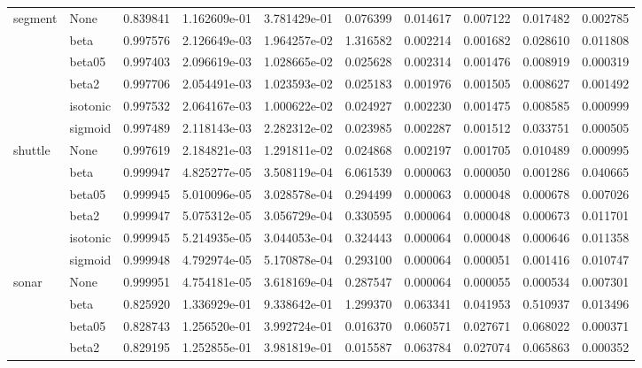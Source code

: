 \begin{tabular}{llrrrrrrrr}
segment & None &  0.839841 &  1.162609e-01 &  3.781429e-01 &   0.076399 &  0.014617 &  0.007122 &  0.017482 &  0.002785 \\
        & beta &  0.997576 &  2.126649e-03 &  1.964257e-02 &   1.316582 &  0.002214 &  0.001682 &  0.028610 &  0.011808 \\
        & beta05 &  0.997403 &  2.096619e-03 &  1.028665e-02 &   0.025628 &  0.002314 &  0.001476 &  0.008919 &  0.000319 \\
        & beta2 &  0.997706 &  2.054491e-03 &  1.023593e-02 &   0.025183 &  0.001976 &  0.001505 &  0.008627 &  0.001492 \\
        & isotonic &  0.997532 &  2.064167e-03 &  1.000622e-02 &   0.024927 &  0.002230 &  0.001475 &  0.008585 &  0.000999 \\
        & sigmoid &  0.997489 &  2.118143e-03 &  2.282312e-02 &   0.023985 &  0.002287 &  0.001512 &  0.033751 &  0.000505 \\
shuttle & None &  0.997619 &  2.184821e-03 &  1.291811e-02 &   0.024868 &  0.002197 &  0.001705 &  0.010489 &  0.000995 \\
        & beta &  0.999947 &  4.825277e-05 &  3.508119e-04 &   6.061539 &  0.000063 &  0.000050 &  0.001286 &  0.040665 \\
        & beta05 &  0.999945 &  5.010096e-05 &  3.028578e-04 &   0.294499 &  0.000063 &  0.000048 &  0.000678 &  0.007026 \\
        & beta2 &  0.999947 &  5.075312e-05 &  3.056729e-04 &   0.330595 &  0.000064 &  0.000048 &  0.000673 &  0.011701 \\
        & isotonic &  0.999945 &  5.214935e-05 &  3.044053e-04 &   0.324443 &  0.000064 &  0.000048 &  0.000646 &  0.011358 \\
        & sigmoid &  0.999948 &  4.792974e-05 &  5.170878e-04 &   0.293100 &  0.000064 &  0.000051 &  0.001416 &  0.010747 \\
sonar & None &  0.999951 &  4.754181e-05 &  3.618169e-04 &   0.287547 &  0.000064 &  0.000055 &  0.000534 &  0.007301 \\
        & beta &  0.825920 &  1.336929e-01 &  9.338642e-01 &   1.299370 &  0.063341 &  0.041953 &  0.510937 &  0.013496 \\
        & beta05 &  0.828743 &  1.256520e-01 &  3.992724e-01 &   0.016370 &  0.060571 &  0.027671 &  0.068022 &  0.000371 \\
        & beta2 &  0.829195 &  1.252855e-01 &  3.981819e-01 &   0.015587 &  0.063784 &  0.027074 &  0.065863 &  0.000352 \\

\end{tabular}

